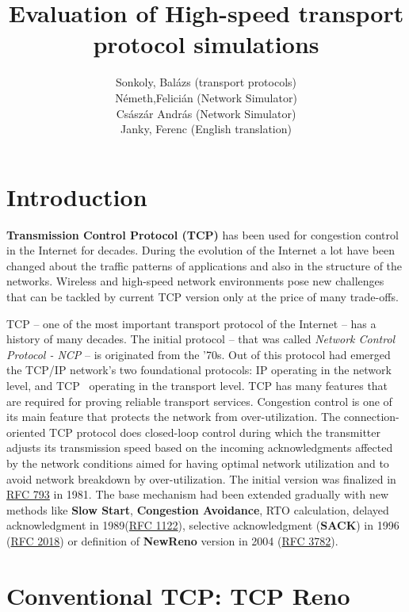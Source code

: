 \documentclass[a4paper]{article}
\title{Evaluation of High-speed transport protocol simulations}
\author{Sonkoly, Balázs (transport protocols) \\ Németh,Felicián (Network Simulator) \\Császár András (Network
Simulator) \\ Janky, Ferenc (English translation)
}
\date{}
\begin{document}
\maketitle

\tableofcontents

\section{Introduction}

\textbf{Transmission Control Protocol (TCP)} has been used for congestion control in the Internet for decades. During
the evolution of the Internet a lot have been changed about the traffic patterns of applications and also in the
structure of the networks. Wireless and high-speed network environments pose new challenges that can be tackled by
current TCP version only at the price of many trade-offs.

TCP -- one of the most important transport protocol of the Internet -- has a history of many decades. The initial
protocol -- that was called \emph{Network Control Protocol - NCP} -- is originated from the '70s. Out of this protocol
had emerged the TCP/IP network's two foundational protocols: IP operating in the network level, and
TCP~\cite{CongestionAvoidance} operating in the transport level. TCP has many features that are required for proving
reliable transport services. Congestion control is one of its main feature that protects the network from
over-utilization. The connection-oriented TCP protocol does closed-loop control during which the transmitter adjusts
its transmission speed based on the incoming acknowledgments affected by the network conditions aimed for having
optimal network utilization and to avoid network breakdown by over-utilization. The initial version was finalized in
\href{http://www.faqs.org/rfcs/rfc793.html}{RFC 793} in 1981. The base mechanism had been extended gradually with new
methods like \textbf{Slow Start}, \textbf{Congestion Avoidance}, RTO calculation, delayed acknowledgment in
1989(\href{http://www.faqs.org/rfcs/rfc1122.html}{RFC 1122}), selective acknowledgment (\textbf{SACK}) in 1996
(\href{http://www.faqs.org/rfcs/rfc2018.html}{RFC 2018}) or definition of \textbf{NewReno} version in 2004
(\href{http://www.faqs.org/rfcs/rfc3782.html}{RFC 3782}).

\section{Conventional TCP: TCP Reno}
\end{document}
